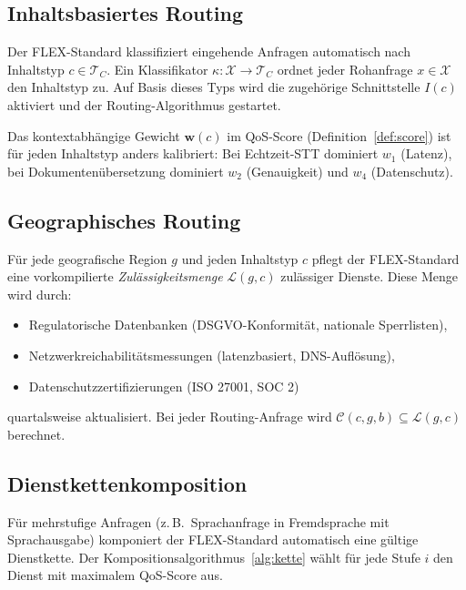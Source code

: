 ﻿\documentclass[a4paper,12pt]{article}
\theoremstyle{definition}
\begin{document}
\subsection{Inhaltsbasiertes Routing}

Der FLEX-Standard klassifiziert eingehende Anfragen automatisch nach Inhaltstyp $c \in \mathcal{T}_C$. Ein Klassifikator $\kappa: \mathcal{X} \to \mathcal{T}_C$ ordnet jeder Rohanfrage $x \in \mathcal{X}$ den Inhaltstyp zu. Auf Basis dieses Typs wird die zugehörige Schnittstelle $I(c)$ aktiviert und der Routing-Algorithmus gestartet.

Das kontextabhängige Gewicht $\mathbf{w}(c)$ im QoS-Score (Definition~\ref{def:score}) ist für jeden Inhaltstyp anders kalibriert: Bei Echtzeit-STT dominiert $w_1$ (Latenz), bei Dokumentenübersetzung dominiert $w_2$ (Genauigkeit) und $w_4$ (Datenschutz).

\subsection{Geographisches Routing}

Für jede geografische Region $g$ und jeden Inhaltstyp $c$ pflegt der FLEX-Standard eine vorkompilierte \emph{Zulässigkeitsmenge} $\mathcal{L}(g, c)$ zulässiger Dienste. Diese Menge wird durch:

\begin{itemize}
    \item Regulatorische Datenbanken (DSGVO-Konformität, nationale Sperrlisten),
    \item Netzwerkreichabilitätsmessungen (latenzbasiert, DNS-Auflösung),
    \item Datenschutzzertifizierungen (ISO 27001, SOC 2)
\end{itemize}

quartalsweise aktualisiert. Bei jeder Routing-Anfrage wird $\mathcal{C}(c,g,b) \subseteq \mathcal{L}(g,c)$ berechnet.

\subsection{Dienstkettenkomposition}

Für mehrstufige Anfragen (z.\,B.\ Sprachanfrage in Fremdsprache mit Sprachausgabe) komponiert der FLEX-Standard automatisch eine gültige Dienstkette. Der Kompositionsalgorithmus~\ref{alg:kette} wählt für jede Stufe $i$ den Dienst mit maximalem QoS-Score aus.
\end{document}
